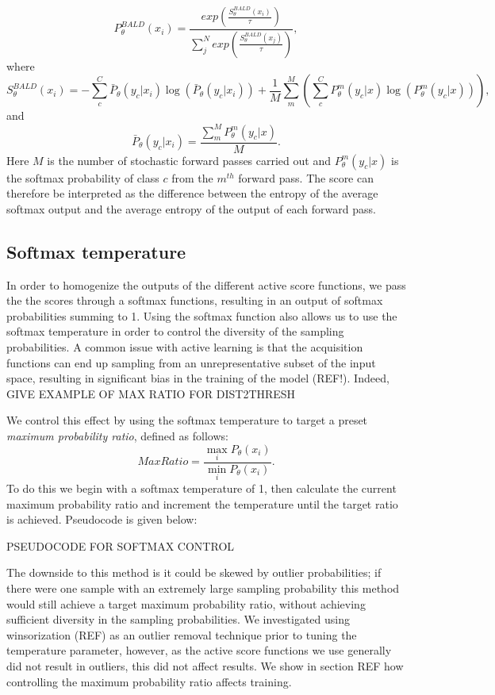 \begin{equation}
P_{\theta}^{BALD} (x_i) = \frac{exp(\frac{S^{BALD}_{\theta}(x_i)}{\tau})}{\sum_{j}^{N} exp(\frac{S^{BALD}_{\theta}(x_j)}{\tau})},
\end{equation}
where
\begin{equation}
S^{BALD}_{\theta}(x_i) = - \sum_{c}^{C} \bar{P}_{\theta}(y_c|x_i)\log( \bar{P}_{\theta}(y_c|x_i)) + \frac{1}{M} \sum_{m}^{M} (\sum_{c}^{C} P^{m}_{\theta}(y_c|x)\log(P^{m}_{\theta}(y_c|x))),
\end{equation}
and
\begin{equation}
 \bar{P}_{\theta}(y_c|x_i) = \frac{\sum_{m}^{M}P^{m}_{\theta}(y_c|x)}{M}. 
\end{equation}
Here $M$ is the number of stochastic forward passes carried out and $P^{m}_{\theta}(y_c|x)$ is the softmax probability of class $c$ from the $m^{th}$ forward pass. The score can therefore be interpreted as the difference between the entropy of the average softmax output and the average entropy of the output of each forward pass.
 
 \subsection{Softmax temperature}\label{Methods_SoftmaxTemperature}
In order to homogenize the outputs of the different active score functions, we pass the the scores through a softmax functions, resulting in an output of softmax probabilities summing to 1. Using the softmax function also allows us to use the softmax temperature in order to control the diversity of the sampling probabilities. A common issue with active learning is that the acquisition functions can end up sampling from an unrepresentative subset of the input space, resulting in significant bias in the training of the model (REF!). Indeed, GIVE EXAMPLE OF MAX RATIO FOR DIST2THRESH

We control this effect by using the softmax temperature to target a preset \textit{maximum probability ratio}, defined as follows:
\begin{equation}
Max Ratio = \frac{\max_{i} P_\theta(x_i)}{\min_{i} P_\theta(x_i)}.
\end{equation}
To do this we begin with a softmax temperature of 1, then calculate the current maximum probability ratio and increment the temperature until the target ratio is achieved. Pseudocode is given below:

PSEUDOCODE FOR SOFTMAX CONTROL

The downside to this method is it could be skewed by outlier probabilities; if there were one sample with an extremely large sampling probability this method would still achieve a target maximum probability ratio, without achieving sufficient diversity in the sampling probabilities. We investigated using winsorization (REF) as an outlier removal technique prior to tuning the temperature parameter, however, as the active score functions we use generally did not result in outliers, this did not affect results.  We show in section REF how controlling the maximum probability ratio affects training. 

